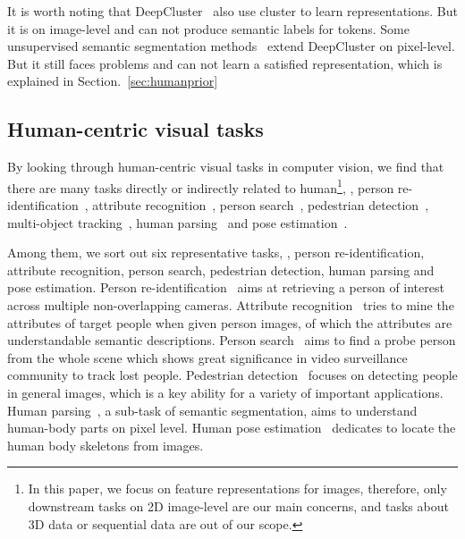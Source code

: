 \documentclass[10pt,twocolumn,letterpaper]{article}
\begin{document}
It is worth noting that DeepCluster~\cite{deepcluster} also use cluster to learn representations. But it is on image-level and can not produce semantic labels for tokens. Some unsupervised semantic segmentation methods~\cite{Cho2021PiCIE} extend DeepCluster on pixel-level. But it still faces problems and can not learn a satisfied representation, which is explained in Section.~\ref{sec:humanprior}

\subsection{Human-centric visual tasks}

By looking through human-centric visual tasks in computer vision, we find that there are many tasks directly or indirectly related to human\footnote{In this paper, we focus on feature representations for images, therefore, only downstream tasks on 2D image-level are our main concerns, and tasks about 3D data or sequential data are out of our scope.}, \eg, person re-identification~\cite{reidsurvey1,gu20201st,isobe2021towards,dou2022reliability,gu2022multi}, attribute recognition~\cite{attrsurvey1,attrsurvey2,pa100k}, person search~\cite{cuhk-sysu,prw}, pedestrian detection~\cite{detsurvey1,detsurvey2,pedestron}, multi-object tracking~\cite{chen2016tcsvt,chen2014novel,liu2021city,liu2022adaptive,tang2021simple}, human parsing~\cite{parsesurvey1,lip} and pose estimation~\cite{posesurvey1,posesurvey2}.

Among them, we sort out six representative tasks, \ie, person re-identification, attribute recognition, person search, pedestrian detection, human parsing and pose estimation. 
Person re-identification~\cite{jiang2021exploring,zhang2022graph,chen2022tagperson,wang2022refining,pan2022dynamic} aims at retrieving a person of interest across multiple non-overlapping cameras. 
Attribute recognition~\cite{attrsurvey1,peta,rap,pa100k} tries to mine the attributes of target people when given person images, of which the attributes are understandable semantic descriptions. Person search~\cite{cuhk-sysu,prw} aims to find a probe person from the whole scene which shows great significance in video surveillance community to track lost people.
Pedestrian detection~\cite{detsurvey1,pedestron,cityperson,caltech} focuses on detecting people in general images, which is a key ability for a variety of important applications. 
Human parsing~\cite{parsesurvey1,lip,schp}, a sub-task of semantic segmentation, aims to understand human-body parts on pixel level.
Human pose estimation~\cite{posesurvey1,mpii,hrformer} dedicates to locate the human body skeletons from images. 
\end{document}
